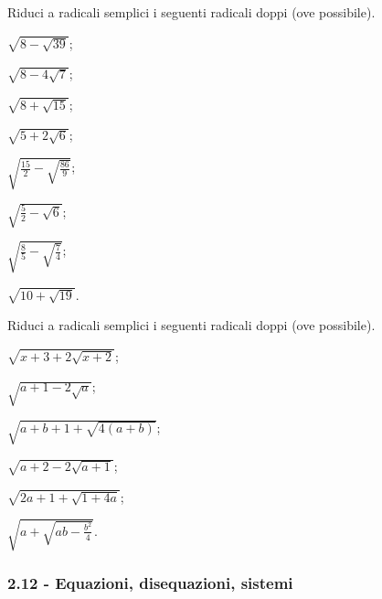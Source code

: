 \begin{esercizio}
 \label{ese:2.98}
Riduci a radicali semplici i seguenti radicali doppi (ove possibile).
 \begin{multicols}{4}
 \begin{enumeratea}
 \item $\sqrt{8-\sqrt{39}}$;
 \item $\sqrt{8-4\sqrt 7}$;
 \item $\sqrt{8+\sqrt{15}}$;
 \item $\sqrt{5+2\sqrt 6}$;
 \item $\sqrt{\frac{15} 2-\sqrt{\frac{86} 9}}$;
 \item $\sqrt{\frac 5 2-\sqrt 6}$;
 \item $\sqrt{\frac 8 5-\sqrt{\frac 7 4}}$;
 \item $\sqrt{10+\sqrt{19}}$.
 \end{enumeratea}
 \end{multicols}
\end{esercizio}

\begin{esercizio}[\Ast]
 \label{ese:2.99}
Riduci a radicali semplici i seguenti radicali doppi (ove possibile).
 \begin{multicols}{2}
 \begin{enumeratea}
 \item $\sqrt{x+3+2\sqrt{x+2}}$;
 \item $\sqrt{a+1-2\sqrt{a}}$;
 \item $\sqrt{a+b+1+\sqrt{4(a+b)}}$;
 \item $\sqrt{a+2-2\sqrt{a+1}}$;
 \item $\sqrt{2a+1+\sqrt{1+4a}}$;
 \item $\sqrt{a+\sqrt{ab-\frac{b^{2}}{4}}}$.
 \end{enumeratea}
 \end{multicols}
\end{esercizio}
\pagebreak
\subsubsection*{2.12 - Equazioni, disequazioni, sistemi}

